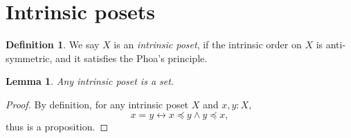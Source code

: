 \documentclass[12pt]{amsart}
\newtheorem{lemma}[theorem]{Lemma}
\theoremstyle{definition}
\newtheorem{definition}[theorem]{Definition}
\newcommand{\mbb}[1]{\mathbb{#1}}
\newcommand{\I}{\mbb I}
\newcommand{\ms}[1]{\mathsf{#1}}
\newcommand{\hook}{\hookrightarrow}
\newcommand{\fa}[2]{\forall #1\!\colon\!\!#2.\ }
\newcommand{\ex}[2]{\exists #1\!\colon\!\!#2.\ }
\newcommand{\eq}{\leftrightarrow}
\newcommand{\pp}{\ms{Prop}}
\begin{document}








\section{Intrinsic posets}\label{sec:synposet}

\begin{definition}
  We say $X$ is an \emph{intrinsic poset}, if the intrinsic order on $X$ is anti-symmetric, and it satisfies the Phoa's principle.
\end{definition}

\begin{lemma}
  Any intrinsic poset is a set.
\end{lemma}
\begin{proof}
  By definition, for any intrinsic poset $X$ and $x,y : X$, 
  \[ x = y \eq x \preceq y \wedge y \preceq x, \] 
  thus is a proposition.
\end{proof}
\end{document}
